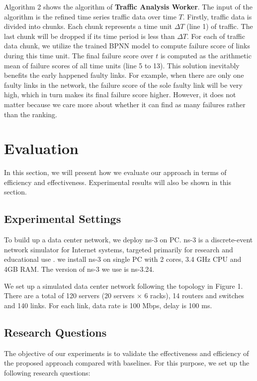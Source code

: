 \documentclass{sig-alternate-05-2015}
\begin{document}
Algorithm 2 shows the algorithm of \textbf{Traffic Analysis Worker}. The input of the algorithm is the refined time series traffic data over time $T$. Firstly, traffic data is divided into chunks. Each chunk represents a time unit $\Delta T$ (line 1) of traffic. The last chunk will be dropped if its time period is less than $\Delta T$. For each of traffic data chunk, we utilize the trained BPNN model to compute failure score of links during this time unit. The final failure score over $t$ is computed as the arithmetic mean of failure scores of all time units (line 5 to 13). This solution inevitably benefits the early happened faulty links. For example, when there are only one faulty links in the network, the failure score of the sole faulty link will be very high, which in turn makes its final failure score higher. However, it does not matter because we care more about whether it can find as many failures rather than the ranking.


\section{Evaluation}
In this section, we will present how we evaluate our approach in terms of efficiency and effectiveness. Experimental results will also be shown in this section.

\subsection{Experimental Settings}
To build up a data center network, we deploy ns-3 on PC. ns-3 is a discrete-event network simulator for Internet systems, targeted primarily for research and educational use \cite{henderson2008network}. we install ns-3 on single PC with 2 cores, 3.4 GHz CPU and 4GB RAM. The version of ns-3 we use is ns-3.24.

We set up a simulated data center network following the topology in Figure 1. There are a total of 120 servers (20 servers $\times$ 6 racks), 14 routers and switches and 140 links. For each link, data rate is 100 Mbps, delay is 100 ms.

\subsection{Research Questions}
The objective of our experiments is to validate the effectiveness and efficiency of the proposed approach compared with baselines. For this purpose, we set up the following research questions:
\end{document}
